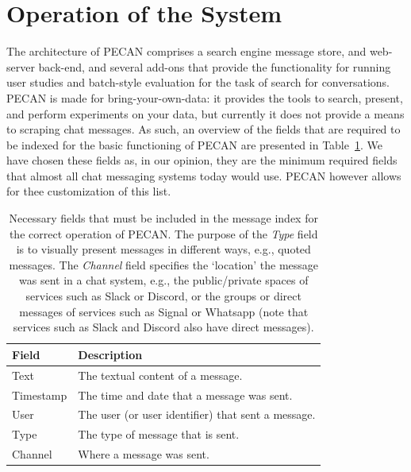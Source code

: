 \graphicspath{ {./images/} }
\section{Operation of the System}

The architecture of PECAN comprises a search engine message store, and web-server back-end, and several add-ons that provide the functionality for running user studies and batch-style evaluation for the task of search for conversations. PECAN is made for bring-your-own-data: it provides the tools to search, present, and perform experiments on your data, but currently it does not provide a means to scraping chat messages. As such, an overview of the fields that are required to be indexed for the basic functioning of PECAN are presented in Table~\ref{table:fields}. We have chosen these fields as, in our opinion, they are the minimum required fields that almost all chat messaging systems today would use. PECAN however allows for thee customization of this list.

\begin{table}
\centering
\begin{tabular}{ll}
	\hline
	Field     & Description                                        \\ \hline
	Text      & The textual content of a message.                  \\
	Timestamp & The time and date that a message was sent.         \\
	User      & The user (or user identifier) that sent a message. \\
	Type      & The type of message that is sent.                  \\
	Channel   & Where a message was sent.                          \\ \hline
\end{tabular}
\caption{Necessary fields that must be included in the message index for the correct operation of PECAN. The purpose of the \textit{Type} field is to visually present messages in different ways, e.g., quoted messages. The \textit{Channel} field specifies the `location' the message was sent in a chat system, e.g., the public/private spaces of services such as Slack or Discord, or the groups or direct messages of services such as Signal or Whatsapp (note that services such as Slack and Discord also have direct messages).}
\label{table:fields}
\end{table}


